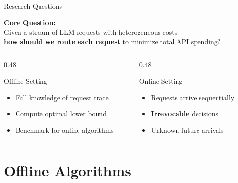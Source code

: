 \documentclass[aspectratio=169,10pt]{beamer}
\begin{document}
\begin{frame}{Research Questions}
\begin{center}
\Large
\textcolor{icmlblue}{\textbf{Core Question:}}\\[0.5cm]
\normalsize
Given a stream of LLM requests with heterogeneous costs,\\
\textbf{how should we route each request} to minimize total API spending?
\end{center}

\vspace{0.5cm}

\begin{columns}[T]
\begin{column}{0.48\textwidth}
\begin{alertblock}{Offline Setting}
\begin{itemize}
    \item Full knowledge of request trace
    \item Compute \alert{optimal lower bound}
    \item Benchmark for online algorithms
\end{itemize}
\end{alertblock}
\end{column}

\begin{column}{0.48\textwidth}
\begin{exampleblock}{Online Setting}
\begin{itemize}
    \item Requests arrive sequentially
    \item \textbf{Irrevocable} decisions
    \item Unknown future arrivals
\end{itemize}
\end{exampleblock}
\end{column}
\end{columns}
\end{frame}

\section{Offline Algorithms}
\end{document}
